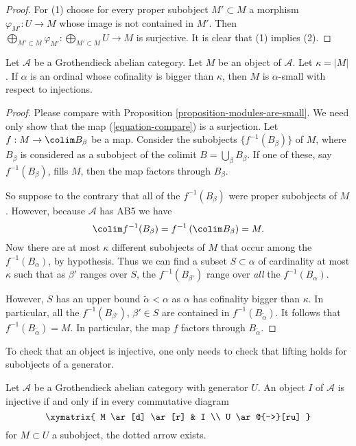 \begin{proof}
For (1) choose for every proper subobject $M' \subset M$ a morphism
$\varphi_{M'} : U \to M$ whose image is not contained in $M'$. Then
$\bigoplus_{M' \subset M} \varphi_{M'} : \bigoplus_{M' \subset M} U \to M$
is surjective. It is clear that (1) implies (2).
\end{proof}

\begin{proposition}
\label{proposition-objects-are-small}
Let $\mathcal{A}$ be a Grothendieck abelian category. Let $M$ be an
object of $\mathcal{A}$. Let $\kappa = |M|$.
If $\alpha$ is an ordinal whose cofinality is bigger than $\kappa$,
then $M$ is $\alpha$-small with respect to injections.
\end{proposition}

\begin{proof}
Please compare with Proposition \ref{proposition-modules-are-small}.
We need only show that the map (\ref{equation-compare}) is a surjection.
Let $f : M \to \colim B_\beta$ be a map.
Consider the subobjects $\{f^{-1}(B_\beta)\}$ of $M$, where $B_\beta$
is considered as a subobject of the colimit $B = \bigcup_\beta B_\beta$.
If one of these, say $f^{-1}(B_\beta)$, fills $M$,
then the map factors through $B_\beta$.

\medskip\noindent
So suppose to the contrary that all of the $f^{-1}(B_\beta)$ were proper
subobjects of $M$. However, because $\mathcal{A}$ has
AB5 we have
$$
\colim f^{-1}(B_\beta) = f^{-1}\left(\colim B_\beta\right) = M.
$$
Now there are at most $\kappa$ different subobjects of $M$ that occur among
the $f^{-1}(B_\alpha)$, by hypothesis.
Thus we can find a subset $S \subset \alpha$ of cardinality at most
$\kappa$ such that as $\beta'$ ranges over $S$, the
$f^{-1}(B_{\beta'})$ range over \emph{all} the $f^{-1}(B_\alpha)$.

\medskip\noindent
However, $S$ has an upper bound $\widetilde{\alpha} < \alpha$ as
$\alpha$ has cofinality bigger than $\kappa$. In particular, all the
$f^{-1}(B_{\beta'})$, $\beta' \in S$ are contained in
$f^{-1}(B_{\widetilde{\alpha}})$.
It follows that $f^{-1}(B_{\widetilde{\alpha}}) = M$.
In particular, the map $f$ factors through $B_{\widetilde{\alpha}}$.
\end{proof}

\begin{lemma}
\label{lemma-characterize-injective}
\begin{slogan}
To check that an object is injective, one only needs to check that lifting
holds for subobjects of a generator.
\end{slogan}
Let $\mathcal{A}$ be a Grothendieck abelian category with generator $U$.
An object $I$ of $\mathcal{A}$ is injective if and only if in every
commutative diagram
$$
\xymatrix{
M \ar[d] \ar[r] &  I \\
U \ar@{-->}[ru]
}
$$
for $M \subset U$ a subobject, the dotted arrow exists.
\end{lemma}

